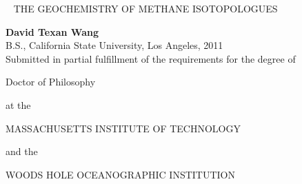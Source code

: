 \thispagestyle{empty}


\vspace*{1in}

{
{\noindent\Large\  \color{myred} \uppercase{the geochemistry of methane isotopologues}}


\vspace{1in}



{\bfseries David Texan Wang}\\

B.S., California State University, Los Angeles, 2011\\

Submitted in partial fulfillment of the requirements for the degree of

Doctor of Philosophy

at the

MASSACHUSETTS INSTITUTE OF TECHNOLOGY

and the

WOODS HOLE OCEANOGRAPHIC INSTITUTION


}







